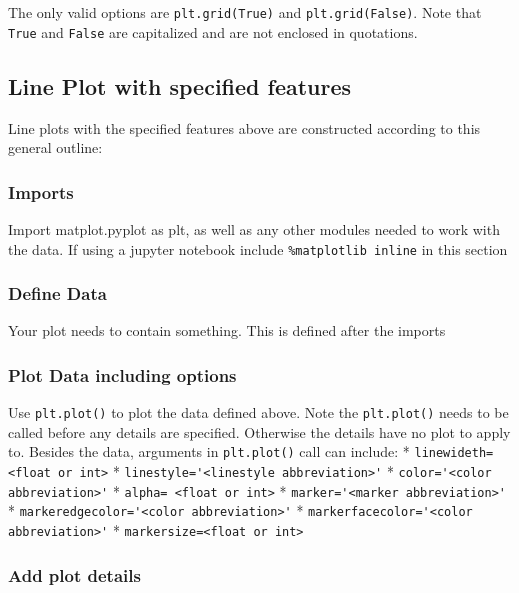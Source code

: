 \documentclass{book}
\begin{document}
The only valid options are \lstinline!plt.grid(True)! and
\lstinline!plt.grid(False)!. Note that \lstinline!True! and
\lstinline!False! are capitalized and are not enclosed in quotations.

    \subsection{Line Plot with specified
features}\label{line-plot-with-specified-features}

    Line plots with the specified features above are constructed according
to this general outline:

\subsubsection{Imports}\label{imports}

Import matplot.pyplot as plt, as well as any other modules needed to
work with the data. If using a jupyter notebook include
\lstinline!%matplotlib inline! in this section

\subsubsection{Define Data}\label{define-data}

Your plot needs to contain something. This is defined after the imports

\subsubsection{Plot Data including
options}\label{plot-data-including-options}

Use \lstinline!plt.plot()! to plot the data defined above. Note the
\lstinline!plt.plot()! needs to be called before any details are
specified. Otherwise the details have no plot to apply to. Besides the
data, arguments in \lstinline!plt.plot()! call can include: *
\lstinline!linewideth= <float or int>! *
\lstinline!linestyle='<linestyle abbreviation>'! *
\lstinline!color='<color abbreviation>'! *
\lstinline!alpha= <float or int>! *
\lstinline!marker='<marker abbreviation>'! *
\lstinline!markeredgecolor='<color abbreviation>'! *
\lstinline!markerfacecolor='<color abbreviation>'! *
\lstinline!markersize=<float or int>!

\subsubsection{Add plot details}\label{add-plot-details}
\end{document}
